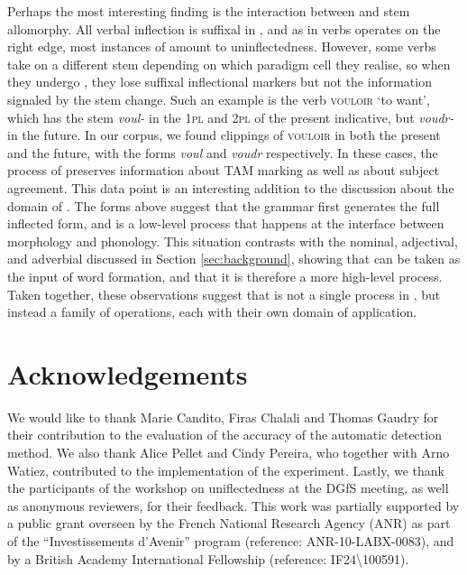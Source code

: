 \documentclass[output=paper,colorlinks,citecolor=brown]{langscibook}
\begin{document}
Perhaps the most interesting finding is the interaction between  and stem allomorphy. All verbal inflection is suffixal in , and as  in  verbs operates on the right edge, most instances of  amount to uninflectedness. However, some  verbs take on a different stem depending on which paradigm cell they realise, so when they undergo , they lose suffixal inflectional markers but not the information signaled by the stem change. Such an example is the verb \textsc{vouloir} `to want', which has the stem \textit{voul-} in the \textsc{1pl} and \textsc{2pl} of the present indicative, but \textit{voudr-} in the future. In our corpus, we found clippings of \textsc{vouloir} in both the present and the future, with the forms \textit{voul} and \textit{voudr} respectively. In these cases, the process of  preserves information about TAM marking as well as about subject agreement. This data point is an interesting addition to the discussion about the domain of . The forms above suggest that the grammar first generates the full inflected form, and  is a low-level process that happens at the interface between morphology and phonology. This situation contrasts with the nominal, adjectival, and adverbial  discussed in Section \ref{sec:background}, showing that  can be taken as the input of word formation, and that it is therefore a more high-level process. Taken together, these observations suggest that  is not a single process in , but instead a family of operations, each with their own domain of application.
 
 
%
\section*{Acknowledgements}
We would like to thank Marie Candito, Firas Chalali and Thomas Gaudry for their contribution to the evaluation of the accuracy of the automatic detection method. We also thank Alice Pellet and Cindy Pereira, who together with Arno Watiez, contributed to the implementation of the experiment. Lastly, we thank the participants of the workshop on uniflectedness at the DGfS meeting, as well as anonymous reviewers, for their feedback. This work was partially supported by a public grant overseen by the French National Research Agency (ANR) as part of the “Investissements d’Avenir” program (reference: ANR-10-LABX-0083), and by a British Academy International Fellowship (reference: IF24\textbackslash100591).
\end{document}
